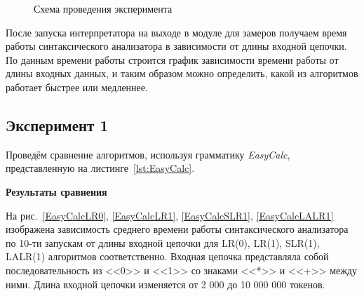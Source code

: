\documentclass[14pt]{matmex-diploma}
\begin{document}
\begin{figure}[h]
  \caption{Схема проведения эксперимента}
  \label{Interpreter}
\end{figure}

После запуска интерпретатора на выходе в модуле для замеров получаем время работы синтаксического анализатора в зависимости от длины входной цепочки. По данным времени работы строится график зависимости времени работы от длины входных данных, и таким образом можно определить, какой из алгоритмов работает быстрее или медленнее.

\subsection{Эксперимент 1}
Проведём сравнение алгоритмов, используя грамматику \textit{EasyCalc}, представленную на листинге~\ref{lst:EasyCalc}.

{\large \textbf{Результаты сравнения}}

На рис.~\ref{EasyCalcLR0}, \ref{EasyCalcLR1}, \ref{EasyCalcSLR1}, \ref{EasyCalcLALR1} изображена зависимость среднего времени работы синтаксического анализатора по 10-ти запускам от длины входной цепочки для LR(0), LR(1), SLR(1), LALR(1) алгоритмов соответственно. Входная цепочка представляла собой последовательность из <<0>> и <<1>> со знаками <<*>> и <<+>> между ними. Длина входной цепочки изменяется от 2 000 до 10 000 000 токенов.
\end{document}

